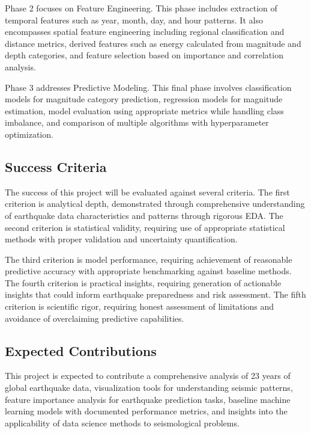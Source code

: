 Phase 2 focuses on Feature Engineering. This phase includes extraction of temporal features such as year, month, day, and hour patterns. It also encompasses spatial feature engineering including regional classification and distance metrics, derived features such as energy calculated from magnitude and depth categories, and feature selection based on importance and correlation analysis.

Phase 3 addresses Predictive Modeling. This final phase involves classification models for magnitude category prediction, regression models for magnitude estimation, model evaluation using appropriate metrics while handling class imbalance, and comparison of multiple algorithms with hyperparameter optimization.

\subsection{Success Criteria}

The success of this project will be evaluated against several criteria. The first criterion is analytical depth, demonstrated through comprehensive understanding of earthquake data characteristics and patterns through rigorous EDA. The second criterion is statistical validity, requiring use of appropriate statistical methods with proper validation and uncertainty quantification.

The third criterion is model performance, requiring achievement of reasonable predictive accuracy with appropriate benchmarking against baseline methods. The fourth criterion is practical insights, requiring generation of actionable insights that could inform earthquake preparedness and risk assessment. The fifth criterion is scientific rigor, requiring honest assessment of limitations and avoidance of overclaiming predictive capabilities.

\subsection{Expected Contributions}

This project is expected to contribute a comprehensive analysis of 23 years of global earthquake data, visualization tools for understanding seismic patterns, feature importance analysis for earthquake prediction tasks, baseline machine learning models with documented performance metrics, and insights into the applicability of data science methods to seismological problems.

